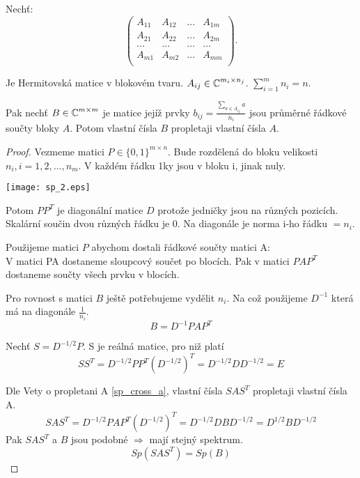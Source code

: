\begin{theorem}[Propletani B]\label{sp_cross_b}
	Nechť:
	\[
	\begin{pmatrix}
		A_{11} & A_{12} & ... & A_{1m}\\
		A_{21} & A_{22} & ... & A_{2m}\\
		... & ... & ... & ... \\
		A_{m1} & A_{m2} & ... & A_{mm}\\
	\end{pmatrix}.
\]

	Je Hermitovská matice v blokovém tvaru. $A_{ij} \in \operatorname{\mathbb{C}}^{m_i \times n_j}$.
	$\sum_{i=1}^m n_i = n$.

	Pak nechť $B \in \operatorname{\mathbb{C}}^{m \times m}$ je matice jejíž prvky $b_{ij} = \frac{\sum_{a \in A_{ij}} a}{n_i} $ jsou průměrné řádkové součty bloky $A$.
	Potom vlastní čísla $B$ propletaji vlastní čísla $A$.
\end{theorem}
\begin{proof}
	Vezmeme matici $P \in \{0, 1\}^{m \times n}$. Bude rozdělená do bloku velikosti $n_i, i = 1,2,...,n_m$.
	V každém řádku 1ky jsou v bloku i, jinak nuly.

	\texttt{[image: sp\_2.eps]}

	Potom $PP^T$ je diagonální matice $D$ protože jedničky jsou na různých pozicích. Skalární součin dvou různých řádku je 0.
	Na diagonále je norma i-ho řádku $= n_i$.

	Použijeme matici $P$ abychom dostali řádkové součty matici A:\\
	V matici PA dostaneme sloupcový součet po blocích. Pak v matici $PAP^T$ dostaneme součty všech prvku v blocích.

	Pro rovnost s matici $B$ ještě potřebujeme vydělit $n_i$. Na což použijeme $D^{-1}$ která má na diagonále $\frac{1}{n_i}$.
	\[ B = D^{-1}PAP^T \]

	Nechť $S = D^{-1/2}P$. S je reálná matice, pro niž platí
	\[ SS^T = D^{-1/2}PP^T(D^{-1/2})^T = D^{-1/2}DD^{-1/2} = E \]

	Dle Vety o propletani A \cref{sp_cross_a}, vlastní čísla $SAS^T$ propletaji vlastní čísla A.
	\[ SAS^T = D^{-1/2}PAP^T(D^{-1/2})^T = D^{-1/2}DBD^{-1/2} = D^{1/2}BD^{-1/2} \]
	Pak $SAS^T$ a $B$ jsou podobné $\Rightarrow$ mají stejný spektrum.
	\[ Sp(SAS^T) = Sp(B) \]
\end{proof}

